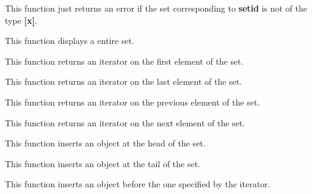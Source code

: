 This function just returns an error if the set corresponding to
\textbf{setid} is not of the type \textbf{[x]}.


This function displays a entire set.


This function returns an iterator on the first element of the set.


This function returns an iterator on the last element of the set.


This function returns an iterator on the previous element of the set.


This function returns an iterator on the next element of the set.


This function inserts an object at the head of the set.


This function inserts an object at the tail of the set.


This function inserts an object before the one specified by the iterator.

